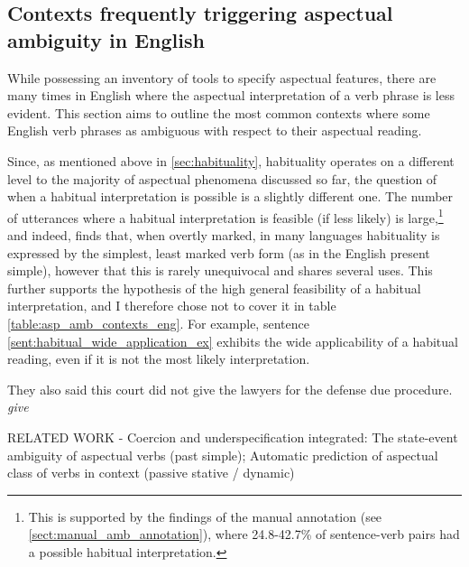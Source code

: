 \subsection{Contexts frequently triggering aspectual ambiguity in English}
While possessing an inventory of tools to specify aspectual features, there are many times in English where the aspectual interpretation of a verb phrase is less evident. This section aims to outline the most common contexts where some English verb phrases as ambiguous with respect to their aspectual reading.

Since, as mentioned above in \ref{sec:habituality}, habituality operates on a different level to the majority of aspectual phenomena discussed so far, the question of when a habitual interpretation is possible is a slightly different one. The number of utterances where a habitual interpretation is feasible (if less likely) is large,\footnote{This is supported by the findings of the manual annotation (see \ref{sect:manual_amb_annotation}), where 24.8-42.7\% of sentence-verb pairs had a possible habitual interpretation.} and indeed, \citep{Dahl1985TenseAA} finds that, when overtly marked, in many languages habituality is expressed by the simplest, least marked verb form (as in the English present simple), however that this is rarely unequivocal and shares several uses. This further supports the hypothesis of the high general feasibility of a habitual interpretation, and I therefore chose not to cover it in table \ref{table:asp_amb_contexts_eng}. For example, sentence \ref{sent:habitual_wide_application_ex} exhibits the wide applicability of a habitual reading, even if it is not the most likely interpretation.

\begin{exe}
    \ex They also said this court did not give the lawyers for the defense due procedure. \emph{give}
    \label{sent:habitual_wide_application_ex}
\end{exe}

RELATED WORK - Coercion and underspecification integrated: The state-event ambiguity of aspectual verbs (past simple); Automatic prediction of aspectual class of verbs in context (passive stative / dynamic)

